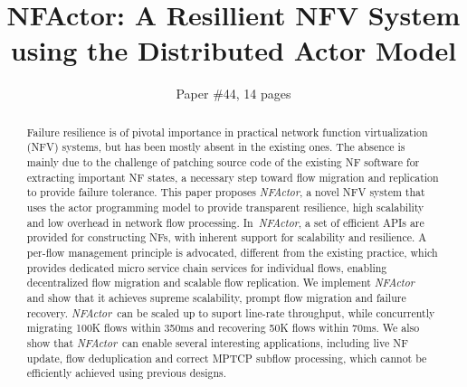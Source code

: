 \documentclass{sig-alternate-10pt}
\def\nfactor{\textit{NFActor}}
\newcommand{\chuan}[1]{\textcolor{red}{{\bf Chuan:} #1}}
\begin{document}
\title{\Large \bf NFActor: A Resillient NFV System using the Distributed Actor Model}


\author{
Paper \#44, 14 pages
}


\maketitle



\begin{abstract}

Failure resilience is of pivotal importance in practical network function virtualization (NFV) systems, but has been mostly absent in the existing ones.
The absence is mainly due to the challenge of patching source code of the existing NF software for extracting important NF states, a necessary step toward flow migration and replication to provide failure tolerance. %
 This paper proposes \nfactor, a novel NFV system that uses the actor programming model to provide transparent resilience, high scalability and low overhead in network flow processing. %
 In~\nfactor, a set of efficient APIs are provided for constructing NFs, with inherent support for scalability and resilience. A per-flow management principle is advocated, different from the existing practice, which provides dedicated micro service chain services for individual flows, enabling decentralized flow migration and scalable flow replication. %
We implement \nfactor~%
 and show that it achieves supreme scalability, prompt flow migration and failure recovery. \nfactor~can be scaled up to suport line-rate throughput, while concurrently migrating 100K flows within 350ms and recovering 50K flows within 70ms.%
We also show that \nfactor~can enable several interesting applications, including live NF update, flow deduplication and correct MPTCP subflow processing, which cannot be efficiently achieved using previous designs. %


\end{abstract}
\end{document}
